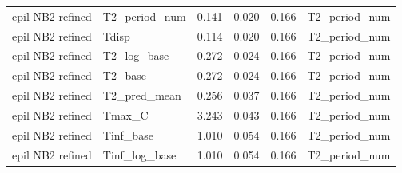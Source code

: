 \begin{center}
\begin{longtable}{llrrrl}
epil NB2 refined & T2\_period\_num & 0.141 & 0.020 & 0.166 & T2\_period\_num \\
epil NB2 refined & Tdisp & 0.114 & 0.020 & 0.166 & T2\_period\_num \\
epil NB2 refined & T2\_log\_base & 0.272 & 0.024 & 0.166 & T2\_period\_num \\
epil NB2 refined & T2\_base & 0.272 & 0.024 & 0.166 & T2\_period\_num \\
epil NB2 refined & T2\_pred\_mean & 0.256 & 0.037 & 0.166 & T2\_period\_num \\
epil NB2 refined & Tmax\_C & 3.243 & 0.043 & 0.166 & T2\_period\_num \\
epil NB2 refined & Tinf\_base & 1.010 & 0.054 & 0.166 & T2\_period\_num \\
epil NB2 refined & Tinf\_log\_base & 1.010 & 0.054 & 0.166 & T2\_period\_num \\
\end{longtable}
\end{center}
